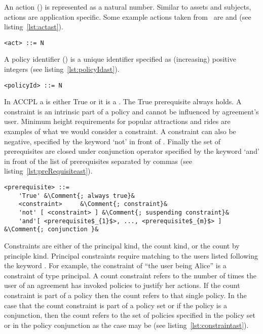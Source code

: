 An action () is represented as a natural number. Similar to assets and subjects, actions are application specific. Some example actions taken from~\cite{pucella2006} are  and  (see listing~\ref{lst:actast}).

\lstset{mathescape, language=AST}  
\begin{lstlisting}[frame=single, caption={act},label={lst:actast}]
<act> ::= N
\end{lstlisting}

A policy identifier () is a unique identifier specified as (increasing) positive integers (see listing~\ref{lst:policyIdast}).

\lstset{mathescape, language=AST}  
\begin{lstlisting}[frame=single, caption={policyId},label={lst:policyIdast}]
<policyId> ::= N
\end{lstlisting}

In \ac{ACCPL} a  is either True or it is a . The True prerequisite always holds. A constraint is an intrinsic part of a policy and cannot be influenced by agreement's user. Minimum height requirements for popular attractions and rides are examples of what we would consider a constraint. A constraint can also be negative, specified by the keyword `not' in front of . Finally the set of prerequisites are closed under conjunction operator specified by the keyword `and' in front of the list of prerequisites separated by commas (see listing~\ref{lst:preRequisiteast}).


\lstset{mathescape, language=AST, escapechar=\&}  
\begin{lstlisting}[frame=single, caption={prerequisite},label={lst:preRequisiteast}]
<prerequisite> ::=  
	'True' &\Comment{; always true}&
	<constraint>	 &\Comment{; constraint}&
	'not' [ <constraint> ] &\Comment{; suspending constraint}&
	'and'[ <prerequisite$_{1}$>, ..., <prerequisite$_{m}$> ] &\Comment{; conjunction }&
\end{lstlisting}

Constraints are either of the principal kind, the count kind, or the count by principle kind. Principal constraints require matching to the users listed following the keyword . For example, the constraint of ``the user being Alice'' is a constraint of type principal. A count constraint refers to the number of times the user of an agreement has invoked policies to justify her actions. If the count constraint is part of a policy then the count refers to that single policy. In the case that the count constraint is part of a policy set or if the policy is a conjunction, then the count refers to the set of policies specified in the policy set or in the policy conjunction as the case may be (see listing~\ref{lst:constraintast}).

